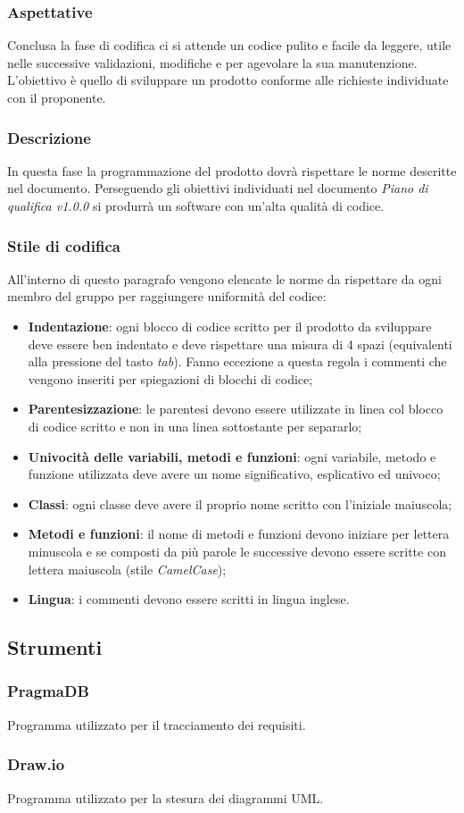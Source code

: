 \subsubsection{Aspettative}\label{2.2.5.2}
Conclusa la fase di codifica ci si attende un codice pulito e facile da leggere, utile nelle successive validazioni, modifiche e per agevolare la sua manutenzione. L'obiettivo è quello di sviluppare un prodotto conforme alle richieste individuate con il proponente. 

\subsubsection{Descrizione}\label{2.2.5.3}
In questa fase la programmazione del prodotto dovrà rispettare le norme descritte nel documento. Perseguendo gli obiettivi individuati nel documento \textit{Piano di qualifica v1.0.0} si produrrà un software con un'alta qualità di codice.

\subsubsection{Stile di codifica}\label{2.2.5.4}
All'interno di questo paragrafo vengono elencate le norme da rispettare da ogni membro del gruppo per raggiungere uniformità del codice:

\begin{itemize}
	\item \textbf{Indentazione}: ogni blocco di codice scritto per il prodotto da sviluppare deve essere ben indentato e deve rispettare una misura di 4 spazi (equivalenti alla pressione del tasto \textit{tab}). Fanno eccezione a questa regola i commenti che vengono inseriti per spiegazioni di blocchi di codice;
	\item \textbf{Parentesizzazione}: le parentesi devono essere utilizzate in linea col blocco di codice scritto e non in una linea sottostante per separarlo;
	\item \textbf{Univocità delle variabili, metodi e funzioni}: ogni variabile, metodo e funzione utilizzata deve avere un nome significativo, esplicativo ed univoco;
	\item \textbf{Classi}: ogni classe deve avere il proprio nome scritto con l'iniziale maiuscola;
	\item \textbf{Metodi e funzioni}: il nome di metodi e funzioni devono iniziare per lettera minuscola e se composti da più parole le successive devono essere scritte con lettera maiuscola (stile \textit{CamelCase});
	\item \textbf{Lingua}: i commenti devono essere scritti in lingua inglese.
\end{itemize}

\subsection{Strumenti}\label{2.2.6}

\subsubsection{PragmaDB}
Programma utilizzato per il tracciamento dei requisiti.
\subsubsection{Draw.io}
Programma utilizzato per la stesura dei diagrammi UML.